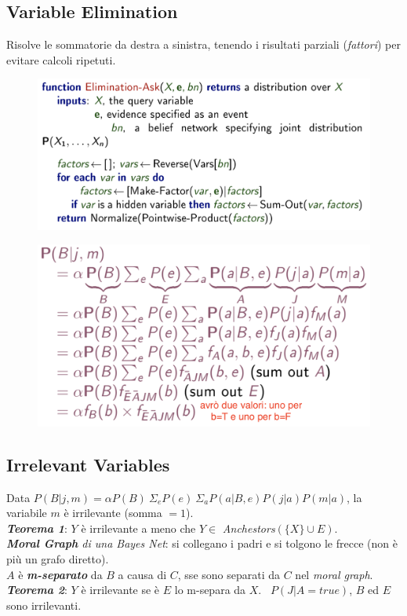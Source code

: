 \documentclass[a4paper, notitlepage, 9pt]{extreport}
\begin{document}
\subsection*{Variable Elimination}
Risolve le sommatorie da destra a sinistra, tenendo i risultati parziali (\textit{fattori}) per evitare calcoli ripetuti.
\begin{multicols}{2}
	\begin{figure}[H]
		\centering
		\includegraphics[scale=0.26]{Alg2}
	\end{figure}
	\columnbreak
	\begin{figure}[H]
		\centering
		\includegraphics[scale=0.25]{VarEl}
	\end{figure}
\end{multicols}

\subsection*{Irrelevant Variables}
Data $P(B|j, m) = \alpha P(B) ~\Sigma_e P(e) ~\Sigma_a P(a | B, e) P(j | a) P(m | a) $, la variabile $m$ è irrilevante (somma $= 1$).\\
\textit{\textbf{Teorema 1}}: $Y$ è irrilevante a meno che $Y\in$ \textit{Anchestors}$(\{X\} \cup E)$.\\
\textit{\textbf{Moral Graph} di una Bayes Net}: si collegano i padri e si tolgono le frecce (non è più un grafo diretto).\\
$A$ è \textbf{\textit{m-separato}} da $B$ a causa di $C$, sse sono separati da $C$ nel \textit{moral graph}.\\
\textit{\textbf{Teorema 2}}: $Y$ è irrilevante se è $E$ lo m-separa da $X$. ~$P(J | A=true)$, $B$ ed $E$ sono irrilevanti.
\end{document}
